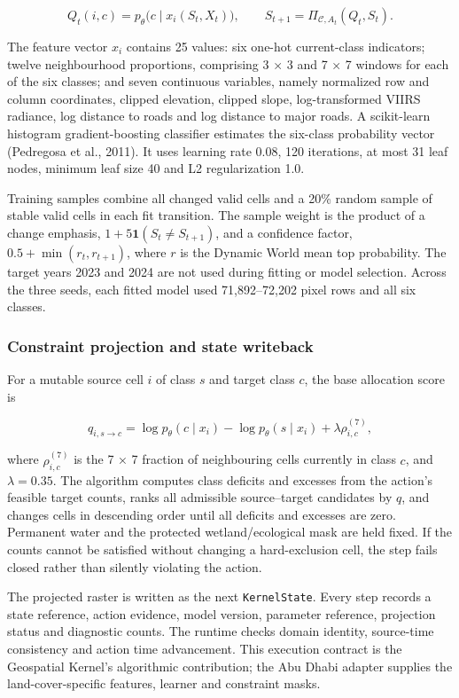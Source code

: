 \[
Q_t(i,c)=p_\theta\big(c\mid x_i(S_t,X_t)\big),
\qquad
S_{t+1}=\Pi_{\mathcal C,A_t}(Q_t,S_t).
\]

The feature vector \(x_i\) contains 25 values: six one-hot current-class
indicators; twelve neighbourhood proportions, comprising 3 × 3 and 7 × 7
windows for each of the six classes; and seven continuous variables,
namely normalized row and column coordinates, clipped elevation, clipped
slope, log-transformed VIIRS radiance, log distance to roads and log
distance to major roads. A scikit-learn histogram gradient-boosting
classifier estimates the six-class probability vector (Pedregosa et al.,
2011). It uses learning rate 0.08, 120 iterations, at most 31 leaf
nodes, minimum leaf size 40 and L2 regularization 1.0.

Training samples combine all changed valid cells and a 20\% random
sample of stable valid cells in each fit transition. The sample weight
is the product of a change emphasis, \(1+5\mathbf{1}(S_t\ne S_{t+1})\),
and a confidence factor, \(0.5+\min(r_t,r_{t+1})\), where \(r\) is the
Dynamic World mean top probability. The target years 2023 and 2024 are
not used during fitting or model selection. Across the three seeds, each
fitted model used 71,892--72,202 pixel rows and all six classes.

\subsubsection{Constraint projection and state
writeback}\label{constraint-projection-and-state-writeback}

For a mutable source cell \(i\) of class \(s\) and target class \(c\),
the base allocation score is

\[
q_{i,s\rightarrow c}=\log p_\theta(c\mid x_i)-\log p_\theta(s\mid x_i)+\lambda\rho^{(7)}_{i,c},
\]

where \(\rho^{(7)}_{i,c}\) is the 7 × 7 fraction of neighbouring cells
currently in class \(c\), and \(\lambda=0.35\). The algorithm computes
class deficits and excesses from the action's feasible target counts,
ranks all admissible source--target candidates by \(q\), and changes
cells in descending order until all deficits and excesses are zero.
Permanent water and the protected wetland/ecological mask are held
fixed. If the counts cannot be satisfied without changing a
hard-exclusion cell, the step fails closed rather than silently
violating the action.

The projected raster is written as the next \texttt{KernelState}. Every
step records a state reference, action evidence, model version,
parameter reference, projection status and diagnostic counts. The
runtime checks domain identity, source-time consistency and action time
advancement. This execution contract is the Geospatial Kernel's
algorithmic contribution; the Abu Dhabi adapter supplies the
land-cover-specific features, learner and constraint masks.

